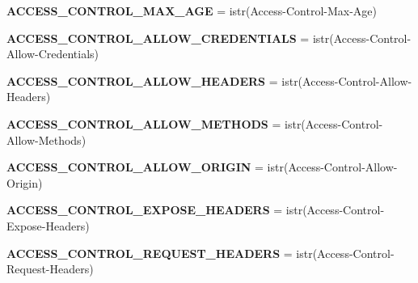 \begin{DoxyCompactItemize}
{\bfseries A\+C\+C\+E\+S\+S\+\_\+\+C\+O\+N\+T\+R\+O\+L\+\_\+\+M\+A\+X\+\_\+\+A\+GE} = istr(\textquotesingle{}Access-\/Control-\/Max-\/Age\textquotesingle{})
\item 
\mbox{\label{namespaceaiohttp_1_1hdrs_a2a9ea1e2b3bb2385c91abc17cb48b24f}} 
{\bfseries A\+C\+C\+E\+S\+S\+\_\+\+C\+O\+N\+T\+R\+O\+L\+\_\+\+A\+L\+L\+O\+W\+\_\+\+C\+R\+E\+D\+E\+N\+T\+I\+A\+LS} = istr(\textquotesingle{}Access-\/Control-\/Allow-\/Credentials\textquotesingle{})
\item 
\mbox{\label{namespaceaiohttp_1_1hdrs_ad7f932e89763bc2f19037e07461396ae}} 
{\bfseries A\+C\+C\+E\+S\+S\+\_\+\+C\+O\+N\+T\+R\+O\+L\+\_\+\+A\+L\+L\+O\+W\+\_\+\+H\+E\+A\+D\+E\+RS} = istr(\textquotesingle{}Access-\/Control-\/Allow-\/Headers\textquotesingle{})
\item 
\mbox{\label{namespaceaiohttp_1_1hdrs_a5b38aa176f050e5083ea201501d17aac}} 
{\bfseries A\+C\+C\+E\+S\+S\+\_\+\+C\+O\+N\+T\+R\+O\+L\+\_\+\+A\+L\+L\+O\+W\+\_\+\+M\+E\+T\+H\+O\+DS} = istr(\textquotesingle{}Access-\/Control-\/Allow-\/Methods\textquotesingle{})
\item 
\mbox{\label{namespaceaiohttp_1_1hdrs_a5803e2de339c4c00e0a409009f4d5d1d}} 
{\bfseries A\+C\+C\+E\+S\+S\+\_\+\+C\+O\+N\+T\+R\+O\+L\+\_\+\+A\+L\+L\+O\+W\+\_\+\+O\+R\+I\+G\+IN} = istr(\textquotesingle{}Access-\/Control-\/Allow-\/Origin\textquotesingle{})
\item 
\mbox{\label{namespaceaiohttp_1_1hdrs_a89475742c1e233bce60aec869724dfdb}} 
{\bfseries A\+C\+C\+E\+S\+S\+\_\+\+C\+O\+N\+T\+R\+O\+L\+\_\+\+E\+X\+P\+O\+S\+E\+\_\+\+H\+E\+A\+D\+E\+RS} = istr(\textquotesingle{}Access-\/Control-\/Expose-\/Headers\textquotesingle{})
\item 
\mbox{\label{namespaceaiohttp_1_1hdrs_a52be3a96643a57c7c06903562190d4ca}} 
{\bfseries A\+C\+C\+E\+S\+S\+\_\+\+C\+O\+N\+T\+R\+O\+L\+\_\+\+R\+E\+Q\+U\+E\+S\+T\+\_\+\+H\+E\+A\+D\+E\+RS} = istr(\textquotesingle{}Access-\/Control-\/Request-\/Headers\textquotesingle{})
\item 
\mbox{\label{namespaceaiohttp_1_1hdrs_ab2967ba9e3b5f596bcbcf726133f380b}} 

\end{DoxyCompactItemize}
